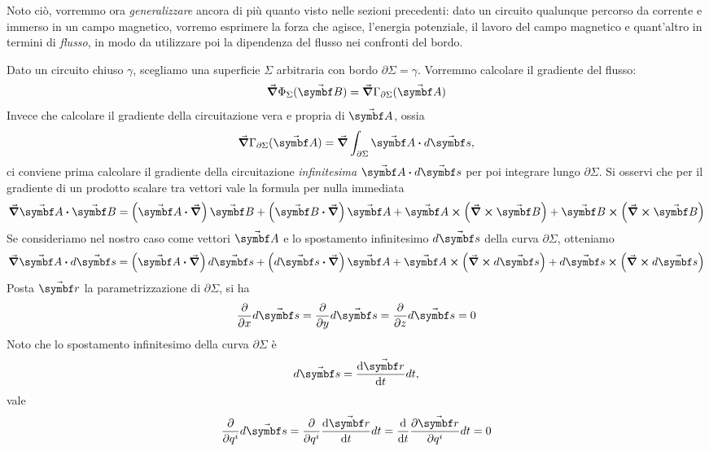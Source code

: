 Noto ciò, vorremmo ora \textit{generalizzare} ancora di più quanto visto nelle sezioni precedenti: dato un circuito qualunque percorso da corrente e immerso in un campo magnetico, vorremo esprimere la forza che agisce, l'energia potenziale, il lavoro del campo magnetico e quant'altro in termini di \textit{flusso}, in modo da utilizzare poi la dipendenza del flusso nei confronti del bordo.

Dato un circuito chiuso $\gamma$, scegliamo una superficie $\Sigma$ arbitraria con bordo $\partial \Sigma=\gamma$. Vorremmo calcolare il gradiente del flusso:
\begin{equation*}
	\grad{\Phi_\Sigma(\vba{B})}=\grad{\Gamma_{\partial\Sigma}(\vba{A})}
\end{equation*}
Invece che calcolare il gradiente della circuitazione vera e propria di $\vba{A}$, ossia
\begin{equation}
	\grad{\Gamma_{\partial\Sigma}(\vba{A})}=\grad{\int_{\partial\Sigma}\vba{A}\vdot d\vba{s}},
\end{equation}
ci conviene prima calcolare il gradiente della circuitazione \textit{infinitesima} $\vba{A}\vdot d\vba{s}$ per poi integrare lungo $\partial\Sigma$.
Si osservi che per il gradiente di un prodotto scalare tra vettori vale la formula per nulla immediata
\begin{equation}
	\grad{\vba{A}\vdot\vba{B}}=\left(\vba{A}\vdot\grad\right)\vba{B}+\left(\vba{B}\vdot\grad\right)\vba{A}+\vba{A}\cross\left(\grad\cross\vba{B}\right)+\vba{B}\cross\left(\grad\cross\vba{B}\right)
\end{equation}
Se consideriamo nel nostro caso come vettori $\vba{A}$ e lo spostamento infinitesimo $d\vba{s}$ della curva $\partial \Sigma$, otteniamo
\begin{equation*}
	\grad{\vba{A}\vdot d\vba{s}}=\left(\vba{A}\vdot\grad\right)d\vba{s}+\left(d\vba{s}\vdot\grad\right)\vba{A}+\vba{A}\cross\left(\grad\cross d\vba{s}\right)+d\vba{s}\cross\left(\grad\cross d\vba{s}\right)
\end{equation*}
Posta $\vba{r}$ la parametrizzazione di $\partial \Sigma$, si ha
\begin{equation*}
	\pdv{x} d\vba{s}=
	\pdv{y} d\vba{s}=
	\pdv{z} d\vba{s}=0
\end{equation*} %
Noto che lo spostamento infinitesimo della curva $\partial \Sigma$ è
\begin{equation*}
	d\vba{s}=\dv{\vba{r}}{t}dt,
\end{equation*}
vale
\begin{equation*}
	\pdv{q^i} d\vba{s}=
	\pdv{q^i} \dv{\vba{r}}{t}dt=
	\dv{t} \pdv{\vba{r}}{q^i}dt=0
\end{equation*}
